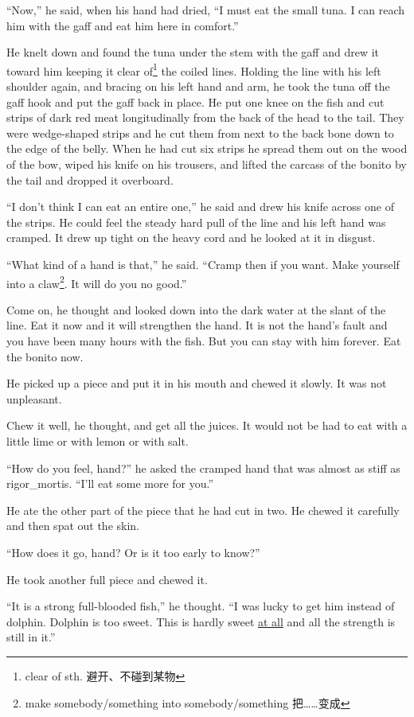 \documentclass[fontset=ubuntu,zihao=-4]{ctexrep}
\newlength{\drop}%
\begin{document}
``Now,'' he said, when his hand had dried, ``I must eat the small tuna. I
can reach him with the gaff and eat him here in comfort.''

He knelt down and found the tuna under the stem with the gaff and drew it
toward him keeping it clear of\footnote{clear of sth. 避开、不碰到某物} the
coiled lines. Holding the line with his left shoulder again, and bracing on
his left hand and arm, he took the tuna off the gaff hook and put the gaff
back in place. He put one knee on the fish and cut strips of dark red meat
\gls{longitudinally} from the back of the head to the tail. They were
\gls{wedge-shaped} strips and he cut them from next to the back bone down to the
edge of the belly. When he had cut six strips he spread them out on the wood
of the bow, \gls{wiped} his knife on his trousers, and lifted the \gls{carcass} of the
bonito by the tail and dropped it overboard.

``I don't think I can eat an \gls{entire} one,'' he said and drew his knife
across one of the strips. He could feel the steady hard pull of the line and
his left hand was cramped. It drew up tight on the heavy cord and he
looked at it in \gls{disgust}.

``What kind of a hand is that,'' he said. ``Cramp then if you want. Make
yourself into a \gls{claw}\footnote{make somebody/something into
  somebody/something 把……变成}. It will do you no good.''

Come on, he thought and looked down into the dark water at the slant of the
line. Eat it now and it will \gls{strengthen} the hand. It is not the hand's
fault and you have been many hours with the fish. But you can stay with him
forever. Eat the bonito now.

He picked up a piece and put it in his mouth and chewed it slowly. It was
not unpleasant.

Chew it well, he thought, and get all the juices. It would not be had to eat
with a little \gls{lime} or with lemon or with salt.

``How do you feel, hand?'' he asked the cramped hand that was almost as
stiff as \gls{rigor_mortis}. ``I'll eat some more for you.''

He ate the other part of the piece that he had cut in two. He chewed it
carefully and then spat out the skin.

``How does it go, hand? Or is it too early to know?''

He took another full piece and chewed it.

``It is a strong \gls{full-blooded} fish,'' he thought. ``I was lucky to get him
\gls{instead} of dolphin. Dolphin is too sweet. This is hardly sweet \uline{at all} and
all the strength is still in it.''
\end{document}
